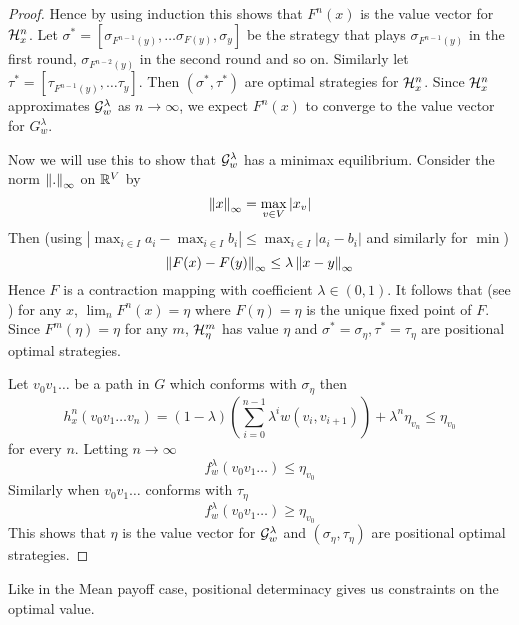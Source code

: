 \begin{proof}
Hence by using induction this shows that $F^n(x)$ is the value vector for $\mathcal{H}^n_x$. Let $\sigma^*=[\sigma_{F^{n-1}(y)},\ldots \sigma_{F(y)},\sigma_y]$ be the strategy that plays $\sigma_{F^{n-1}(y)}$ in the first round, $\sigma_{F^{n-2}(y)}$ in the second round and so on. Similarly let $\tau^*=[\tau_{F^{n-1}(y)},\ldots \tau_y]$. Then $(\sigma^*,\tau^*)$ are optimal strategies for $\mathcal{H}^n_x$. Since $\mathcal{H}^n_x$ approximates $\mathcal{G}^\lambda_w$ as $n \to \infty$, we expect $F^n(x)$ to converge to the value vector for $G^\lambda_w$.

Now we will use this to show that $\mathcal{G}^\lambda_w$ has a minimax equilibrium. Consider the norm $\left\lVert.\right\rVert_\infty$ on $\mathbb{R}^V$ by
\[
    \left\lVert x\right\rVert_\infty = \max_{v \in V} |x_v|
\]
Then (using $|\max_{i\in I} a_i - \max_{i \in I} b_i| \leq \max_{i \in I} |a_i-b_i|$ and similarly for $\min$)
\[
    \left\lVert F(x)-F(y)\right\rVert_\infty \leq \lambda \left\lVert x-y\right\rVert_\infty
\]
Hence $F$ is a contraction mapping with coefficient $\lambda \in (0,1)$. It follows that (see \cite[Chapter~9]{baby_rudin}) for any $x$, $\lim_n F^n(x) = \eta$ where $F(\eta)=\eta$ is the unique fixed point of $F$. Since $F^m(\eta)=\eta$ for any $m$, $\mathcal{H}^m_\eta$ has value $\eta$ and $\sigma^*=\sigma_\eta, \tau^*=\tau_\eta$ are positional optimal strategies.

Let $v_0v_1 \ldots$ be a path in $G$ which conforms with $\sigma_\eta$ then
\[
    h^n_x(v_0 v_1 \ldots v_n) = (1-\lambda) \left( \sum_{i=0}^{n-1} \lambda^i w(v_i,v_{i+1}) \right) + \lambda^n \eta_{v_n} \leq \eta_{v_0}
\]
for every $n$. Letting $n \to \infty$
\[
    f^\lambda_w(v_0 v_1 \ldots) \leq \eta_{v_0}
\]
Similarly when $v_0 v_1 \ldots$ conforms with $\tau_\eta$
\[
    f^\lambda_w(v_0 v_1 \ldots) \geq \eta_{v_0}
\]
This shows that $\eta$ is the value vector for $\mathcal{G}^\lambda_w$ and $(\sigma_\eta,\tau_\eta)$ are positional optimal strategies.
\end{proof}

Like in the Mean payoff case, positional determinacy gives us constraints on the optimal value.

